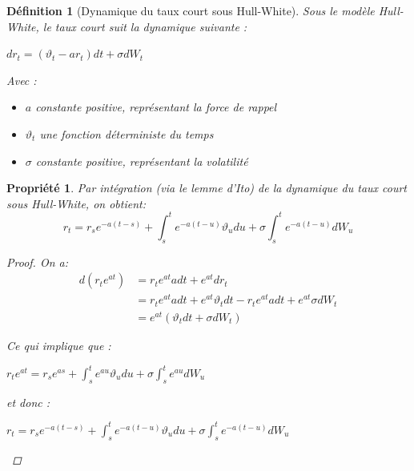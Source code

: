 \documentclass[11pt]{article}
\newtheorem{definition}[theorem]{Définition}
\newtheorem{property}[theorem]{Propriété}
\let\vega\vartheta
\begin{document}
\begin{definition}[Dynamique du taux court sous Hull-White]
Sous le modèle Hull-White, le taux court suit la dynamique suivante : 
\begin{center}
$dr_{t} = (\vega_{t}-ar_{t})dt + \sigma dW_{t}$
\end{center}
Avec :
\begin{itemize}
  \item $a$ constante positive, représentant la force de rappel
  \item $\vega_{t}$ une fonction déterministe du temps
  \item $\sigma$ constante positive, représentant la volatilité
\end{itemize}
\end{definition}

\begin{property}
	Par intégration (via le lemme d'Ito) de la dynamique du taux court sous Hull-White, on obtient: \ 
    \begin{displaymath}
    	r_t = r_{s}e^{-a(t-s)}+\int_s^t e^{-a(t-u)}\vega_u du + \sigma \int_s^t e^{-a(t-u)}dW_u
    \end{displaymath}
    \begin{proof}
    	On a: 
        \begin{align*}
			d(r_{t}e^{at})  &= r_{t}e^{at}adt + e^{at}dr_{t} \\
           					&= r_{t}e^{at}adt + e^{at}\vega_{t}dt - r_{t}e^{at}adt + e^{at}\sigma dW_{t} \\
           					&= e^{at}(\vega_{t}dt+\sigma dW_{t})
		\end{align*}
		
        Ce qui implique que : 
\begin{center}
        $r_{t}e^{at}  = r_{s}e^{as}+\int_s^t e^{au}\vega_u du + \sigma \int_s^t e^{au}dW_u$
        \end{center}
        et donc : 
        \begin{center}
			$r_t = r_{s}e^{-a(t-s)}+\int_s^t e^{-a(t-u)}\vega_u du + \sigma \int_s^t e^{-a(t-u)}dW_u$
        \end{center}
    \end{proof}
\end{property}
\end{document}
